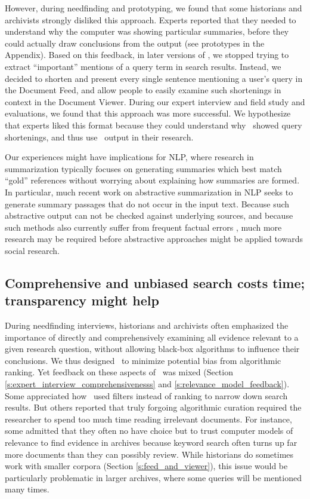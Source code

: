 However, during needfinding and prototyping, we found that some historians and archivists strongly disliked this approach.
Experts reported that they needed to understand why the computer was showing particular summaries, before they could actually draw conclusions from the output (see prototypes in the Appendix).
Based on this feedback, in later versions of \ours, we stopped trying to extract ``important'' mentions of a query term in search results. 
Instead, we decided to shorten and present every single sentence mentioning a user's query in the Document Feed, and allow people to easily examine such shortenings in context in the Document Viewer. 
During our expert interview and field study and evaluations, we found that this approach was more successful. 
We hypothesize that experts liked this format because they could understand {why} \ours~showed query shortenings, and thus use \ours~output in their research.

Our experiences might have implications for NLP, where research in summarization typically focuses on generating summaries which best match ``gold'' references \cite{das2007survey,nenkova2012survey} without worrying about explaining how summaries are formed.
In particular, much recent work on abstractive summarization in NLP \cite{rush-etal-2015-neural,Hermann2015TeachingMT} seeks to generate summary passages that do not occur in the input text.
Because such abstractive output can not be checked against underlying sources, and because such methods also currently suffer from frequent factual errors \cite{kryscinski-etal-2019-neural}, much more research may be required before abstractive approaches might be applied towards social research.

\subsection{Comprehensive and unbiased search costs time; transparency might help}\label{s:discussion_relevance}

During needfinding interviews, historians and archivists often emphasized the importance of directly and comprehensively examining all evidence relevant to a given research question, without allowing black-box algorithms to influence their conclusions.
We thus designed \ours~to minimize potential bias from algorithmic ranking.
Yet feedback on these aspects of \ours~was mixed (Section \ref{s:expert_interview_comprehensivenesss} and \ref{s:relevance_model_feedback}).
Some appreciated how \ours~used filters instead of ranking to narrow down search results.
But others reported that truly forgoing algorithmic curation required the researcher to spend too much time reading irrelevant documents.
For instance, some admitted that they often no have choice but to trust computer models of relevance to find evidence in archives because keyword search often turns up far more documents than they can possibly review.
While historians do sometimes work with smaller corpora (Section \ref{s:feed_and_viewer}), this issue would be particularly problematic in larger archives, where some queries will be mentioned many times. 

